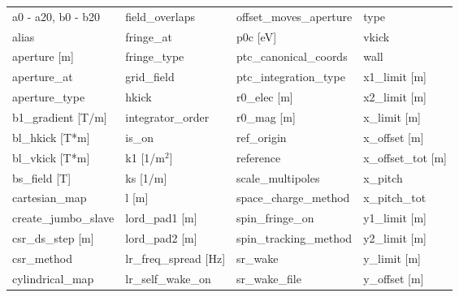  \begin{tabular}{llll} \toprule
a0 - a20, b0 - b20               & field_overlaps                   & offset_moves_aperture            & type                             \\
alias                            & fringe_at                        & p0c [eV]                         & vkick                            \\
aperture [m]                     & fringe_type                      & ptc_canonical_coords             & wall                             \\
aperture_at                      & grid_field                       & ptc_integration_type             & x1_limit [m]                     \\
aperture_type                    & hkick                            & r0_elec [m]                      & x2_limit [m]                     \\
b1_gradient [T/m]                & integrator_order                 & r0_mag [m]                       & x_limit [m]                      \\
bl_hkick [T*m]                   & is_on                            & ref_origin                       & x_offset [m]                     \\
bl_vkick [T*m]                   & k1 [1/m$^2$]                     & reference                        & x_offset_tot [m]                 \\
bs_field [T]                     & ks [1/m]                         & scale_multipoles                 & x_pitch                          \\
cartesian_map                    & l [m]                            & space_charge_method              & x_pitch_tot                      \\
create_jumbo_slave               & lord_pad1 [m]                    & spin_fringe_on                   & y1_limit [m]                     \\
csr_ds_step [m]                  & lord_pad2 [m]                    & spin_tracking_method             & y2_limit [m]                     \\
csr_method                       & lr_freq_spread [Hz]              & sr_wake                          & y_limit [m]                      \\
cylindrical_map                  & lr_self_wake_on                  & sr_wake_file                     & y_offset [m]                     \\

\end{tabular}
